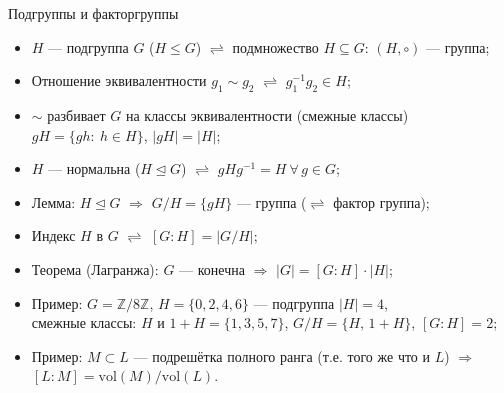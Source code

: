 \documentclass[serif, aspectratio=169]{beamer}
\begin{document}
\begin{frame}{Подгруппы и факторгруппы}
    \begin{itemize}
        \item $H$ --- подгруппа $G$ ($H\leq G$) $\rightleftharpoons$ подмножество $H\subseteq G$: $(H,\circ)$ --- группа;
        \item Отношение эквивалентности $g_1\sim g_2$ $\rightleftharpoons$ $g_1^{-1}g_2\in H$;
        \item $\sim$ разбивает $G$ на классы эквивалентности (смежные классы) $gH=\{gh:\ h\in H\}$, $|gH|=|H|$;
        \item $H$ --- нормальна ($H\trianglelefteq G$) $\rightleftharpoons$ $gHg^{-1}=H\ \forall\,g\in G$;
        \item Лемма: $H\trianglelefteq G$ $\Rightarrow$ $G/H=\{gH\}$ --- группа ($\rightleftharpoons$ фактор группа);
        \item Индекс $H$ в $G$ $\rightleftharpoons$ $[G:H]=|G/H|$;
        \item Теорема (Лагранжа): $G$ --- конечна $\Rightarrow$ $|G|=[G:H]\cdot|H|$;
        \item Пример: $G=\mathbb{Z}/8\mathbb{Z}$, $H=\{0,2,4,6\}$ --- подгруппа $|H|=4$,\\ смежные классы: $H$ и $1+H=\{1,3,5,7\}$, $G/H=\{H,\,1+H\}$, $[G:H]=2$;
        \item Пример: $M\subset L$ --- подрешётка полного ранга (т.е. того же что и $L$) $\Rightarrow$ $[L:M]=\mathrm{vol}(M)/\mathrm{vol}(L)$.
    \end{itemize}
\end{frame}
\end{document}
